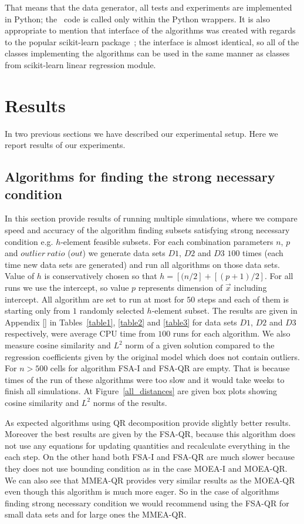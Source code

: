 That means that the data generator, all tests and experiments are implemented in Python; the \CC \  code is called only within the Python wrappers. It is also appropriate to mention that interface of the algorithms was created with regards to the popular scikit-learn package~\cite{scikit-learn}; the interface is almost identical, so all of the classes implementing the algorithms can be used in the same manner as classes from scikit-learn linear regression module.


\section{Results}
In two previous sections we have described our experimental setup. Here we report results of our experiments.

\subsection{Algorithms for finding the strong necessary condition} \label{strong:experiments}
In this section provide results of running multiple simulations, where we compare speed and accuracy of the algorithm finding subsets satisfying strong necessary condition e.g. $h$-element feasible subsets. For each combination parameters $n$, $p$ and $outlier~ratio$ ($out$) we generate data sets  $D1$, $D2$ and $D3$ $100$ times (each time new data sets are generated) and run all algorithms on those data sets. Value of $h$ is conservatively chosen so that $h = [(n/2] + [(p+1)/2]$. For all runs we use the intercept, so value $p$ represents dimension of $\vec{x}$ including intercept. All algorithm are set to run at most for $50$ steps and each of them is starting only from $1$ randomly selected $h$-element subset.  The results are given in Appendix [] in Tables~\ref{table1}, \ref{table2} and \ref{table3} for data sets $D1$, $D2$ and $D3$ respectively, were average CPU time from $100$ runs for each algorithm. We also measure cosine similarity and $L^2$ norm of a given solution compared to the regression coefficients given by the original model which does not contain outliers. For $n > 500$ cells for algorithm FSA-I and FSA-QR are empty. That is because times of the run of these algorithms were too slow and it would take weeks to finish all simulations.
At Figure~\ref{all_distances} are given box plots showing cosine similarity and $L^2$ norms of the results. 

As expected algorithms using QR decomposition provide slightly better results. Moreover the best results are given by the FSA-QR, because this algorithm does not use any equations for updating quantities and recalculate everything in the each step. On the other hand both FSA-I and FSA-QR are much slower because they does not use bounding condition as in the case MOEA-I and MOEA-QR. We can also see that MMEA-QR provides very similar results as the MOEA-QR even though this algorithm is much more eager. So in the case of algorithms finding strong necessary condition we would recommend using the FSA-QR for small data sets and for large ones the MMEA-QR. 

